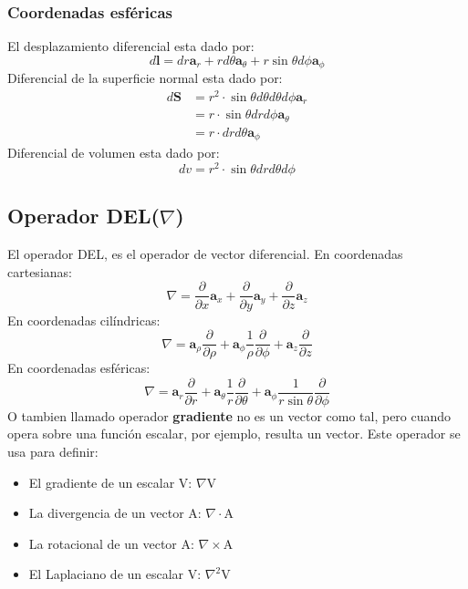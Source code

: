 \documentclass[
	12pt, %
	fleqn, %
	a4paper, %
	oneside, %
]{LegrandOrangeBook}
\begin{document}
\subsubsection{Coordenadas esféricas}
El desplazamiento diferencial esta dado por:
\begin{equation}
\boxed{d\textbf{l}=dr\textbf{a}_r+r d\theta\textbf{a}_{\theta}+r\sin\theta d\phi\textbf{a}_{\phi}}
\end{equation}
Diferencial de la superficie normal esta dado por:
\begin{equation}
\boxed{\begin{split}
d\textbf{S}&=r^2\cdot\sin\theta d\theta d\theta d\phi \textbf{a}_r\\
&=r\cdot\sin\theta dr d\phi\textbf{a}_{\theta}\\
&=r\cdot dr d\theta\textbf{a}_{\phi}
\end{split}}
\end{equation}
Diferencial de volumen esta dado por:
\begin{equation}
\boxed{dv=r^2\cdot\sin\theta dr d\theta d\phi}
\end{equation}
\subsection{Operador DEL($\nabla$)}\label{subsec:DEL}
El operador DEL, es el operador de vector diferencial. En coordenadas cartesianas:
\begin{equation}
\boxed{\nabla=\frac{\partial}{\partial x}\textbf{a}_x+\frac{\partial}{\partial y}\textbf{a}_y+\frac{\partial}{\partial z}\textbf{a}_z}
\end{equation}
En coordenadas cilíndricas:
\begin{equation}
\boxed{\nabla=\textbf{a}_{\rho}\frac{\partial}{\partial\rho}+\textbf{a}_{\phi}\frac{1}{\rho}\frac{\partial}{\partial\phi}+\textbf{a}_z\frac{\partial}{\partial z}}
\end{equation}
En coordenadas esféricas:
\begin{equation}
\boxed{\nabla=\textbf{a}_r\frac{\partial}{\partial r}+\textbf{a}_{\theta}\frac{1}{r}\frac{\partial}{\partial\theta}+\textbf{a}_{\phi}\frac{1}{r\sin\theta}\frac{\partial}{\partial \phi}}
\end{equation}
O tambien llamado operador \textbf{gradiente} no es un vector como tal, pero cuando opera sobre una función escalar, por ejemplo, resulta un vector. Este operador se usa para definir:
\begin{itemize}
\item El gradiente de un escalar V: $\nabla$V
\item La divergencia de un vector A: $\nabla\cdot$A
\item La rotacional de un vector A: $\nabla\times$A
\item El Laplaciano de un escalar V: $\nabla^2$V
\end{itemize}
\end{document}
